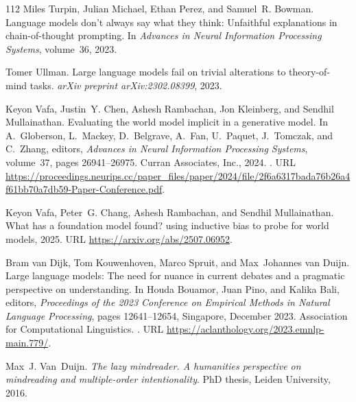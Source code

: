 \begin{thebibliography}{112}
Miles Turpin, Julian Michael, Ethan Perez, and Samuel~R. Bowman.
\newblock Language models don't always say what they think: Unfaithful explanations in chain-of-thought prompting.
\newblock In \emph{Advances in Neural Information Processing Systems}, volume~36, 2023.

Tomer Ullman.
\newblock Large language models fail on trivial alterations to theory-of-mind tasks.
\newblock \emph{arXiv preprint arXiv:2302.08399}, 2023.

Keyon Vafa, Justin~Y. Chen, Ashesh Rambachan, Jon Kleinberg, and Sendhil Mullainathan.
\newblock Evaluating the world model implicit in a generative model.
\newblock In A.~Globerson, L.~Mackey, D.~Belgrave, A.~Fan, U.~Paquet, J.~Tomczak, and C.~Zhang, editors, \emph{Advances in Neural Information Processing Systems}, volume~37, pages 26941--26975. Curran Associates, Inc., 2024.
\newblock {}.
\newblock URL \url{https://proceedings.neurips.cc/paper_files/paper/2024/file/2f6a6317bada76b26a4f61bb70a7db59-Paper-Conference.pdf}.

Keyon Vafa, Peter~G. Chang, Ashesh Rambachan, and Sendhil Mullainathan.
\newblock What has a foundation model found? using inductive bias to probe for world models, 2025.
\newblock URL \url{https://arxiv.org/abs/2507.06952}.

Bram van Dijk, Tom Kouwenhoven, Marco Spruit, and Max~Johannes van Duijn.
\newblock Large language models: The need for nuance in current debates and a pragmatic perspective on understanding.
\newblock In Houda Bouamor, Juan Pino, and Kalika Bali, editors, \emph{Proceedings of the 2023 Conference on Empirical Methods in Natural Language Processing}, pages 12641--12654, Singapore, December 2023. Association for Computational Linguistics.
\newblock {}.
\newblock URL \url{https://aclanthology.org/2023.emnlp-main.779/}.

Max~J. Van~Duijn.
\newblock \emph{The lazy mindreader. A humanities perspective on mindreading and multiple-order intentionality}.
\newblock PhD thesis, Leiden University, 2016.


\end{thebibliography}
